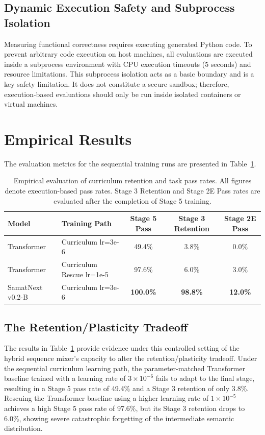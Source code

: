 \documentclass[11pt,a4paper]{article}
\begin{document}
\subsection{Dynamic Execution Safety and Subprocess Isolation}
Measuring functional correctness requires executing generated Python code. To prevent arbitrary code execution on host machines, all evaluations are executed inside a subprocess environment with CPU execution timeouts (5 seconds) and resource limitations. This subprocess isolation acts as a basic boundary and is a key safety limitation. It does not constitute a secure sandbox; therefore, execution-based evaluations should only be run inside isolated containers or virtual machines.

\section{Empirical Results}
The evaluation metrics for the sequential training runs are presented in Table~\ref{tab:main_results_tex}.

\begin{table}[H]
\centering
\small
\begin{tabular}{llccc}
\toprule
Model & Training Path & Stage 5 Pass & Stage 3 Retention & Stage 2E Pass \\
\midrule
Transformer & Curriculum lr=3e-6 & 49.4\% & 3.8\% & 0.0\% \\
Transformer & Curriculum Rescue lr=1e-5 & 97.6\% & 6.0\% & 3.0\% \\
SamatNext v0.2-B & Curriculum lr=3e-6 & \textbf{100.0\%} & \textbf{98.8\%} & \textbf{12.0\%} \\
\bottomrule
\end{tabular}
\caption{Empirical evaluation of curriculum retention and task pass rates. All figures denote execution-based pass rates. Stage 3 Retention and Stage 2E Pass rates are evaluated after the completion of Stage 5 training.}
\label{tab:main_results_tex}
\end{table}

\subsection{The Retention/Plasticity Tradeoff}
The results in Table~\ref{tab:main_results_tex} provide evidence under this controlled setting of the hybrid sequence mixer's capacity to alter the retention/plasticity tradeoff. Under the sequential curriculum learning path, the parameter-matched Transformer baseline trained with a learning rate of $3\times 10^{-6}$ fails to adapt to the final stage, resulting in a Stage 5 pass rate of 49.4\% and a Stage 3 retention of only 3.8\%. Rescuing the Transformer baseline using a higher learning rate of $1\times 10^{-5}$ achieves a high Stage 5 pass rate of 97.6\%, but its Stage 3 retention drops to 6.0\%, showing severe catastrophic forgetting of the intermediate semantic distribution. 
\end{document}
